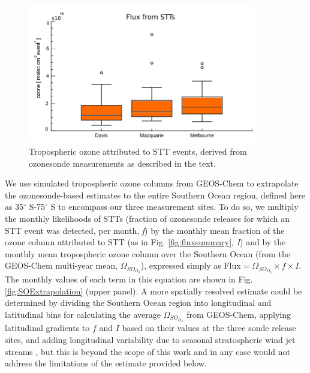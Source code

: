   \begin{figure}[t]
    \includegraphics[width=10cm]{figures/flux_absolute.png}
    \caption{Tropospheric ozone attributed to STT events, derived from ozonesonde measurements as described in the text.}
    \label{fig:fluxsummaryabs}
  \end{figure}
  
  We use simulated tropospheric ozone columns from GEOS-Chem to extrapolate the ozonesonde-based estimates to the entire Southern Ocean region, defined here as 35$^{\circ}$ S-75$^{\circ}$ S to encompass our three measurement sites. 
  To do so, we multiply the monthly likelihoods of STTs (fraction of ozonesonde releases for which an STT event was detected, per month, \textit{f}) by the monthly mean fraction of the ozone column attributed to STT (as in Fig. \ref{fig:fluxsummary}, \textit{I}) and by the monthly mean tropospheric ozone column over the Southern Ocean (from the GEOS-Chem multi-year mean, $\Omega_{SO_{O_3}}$), expressed simply as Flux$= \Omega_{SO_{O_3}} \times f \times I$.
  The monthly values of each term in this equation are shown in Fig. \ref{fig:SOExtrapolation} (upper panel).
  A more spatially resolved estimate could be determined by dividing the Southern Ocean region into longitudinal and latitudinal bins for calculating the average $\Omega_{SO_{O_3}}$ from GEOS-Chem, applying latitudinal gradients to $f$ and $I$ based on their values at the three sonde release sites, and adding longitudinal variability due to seasonal stratospheric wind jet streams \citep{Baray2012}, but this is beyond the scope of this work and in any case would not address the limitations of the estimate provided below.

